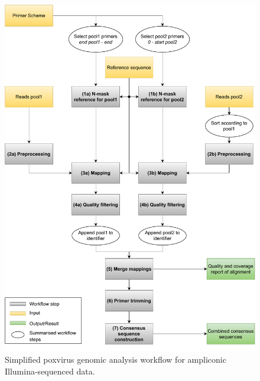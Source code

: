 \begin{figure}[h!]
	\includegraphics[width=1\textwidth]{media/3-pox.pdf}
	\caption{Simplified poxvirus genomic analysis workflow for ampliconic Illumina-sequenced data.}
	\label{fig:3-pox-wf}
\end{figure}

